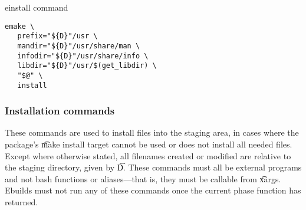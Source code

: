 \begin{description}
\begin{listing}[H]
  \caption{einstall command}\label{lst:einstall}
  \begin{verbatim}
emake \
   prefix="${D}"/usr \
   mandir="${D}"/usr/share/man \
   infodir="${D}"/usr/share/info \
   libdir="${D}"/usr/$(get_libdir) \
   "$@" \
   install
  \end{verbatim}
\end{listing}

\end{description}

\subsubsection{Installation commands}
These commands are used to install files into the staging area, in cases where the package's \t{make
install} target cannot be used or does not install all needed files. Except where otherwise stated,
all filenames created or modified are relative to the staging directory, given by \t{D}. These
commands must all be external programs and not bash functions or aliases---that is, they must be
callable from \t{xargs}. Ebuilds must not run any of these commands once the current phase function
has returned.

